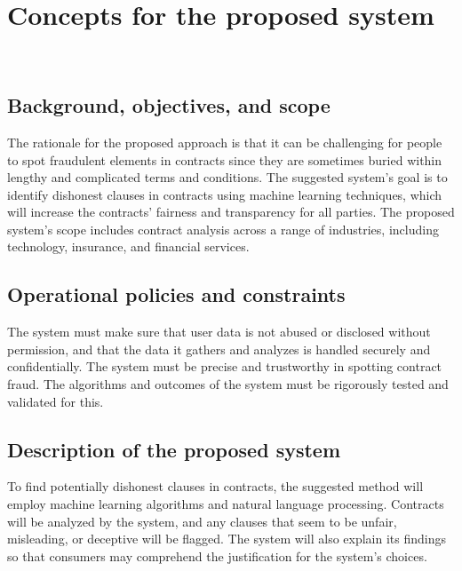 \chapter{Concepts for the proposed system \\
\label{Chapter::Concepts for the proposed system}}\



\section{Background, objectives, and scope \label{Section::Background,objectives,and scope proposed}}
The rationale for the proposed approach is that it can be challenging for people to spot fraudulent elements in contracts since they are sometimes buried within lengthy and complicated terms and conditions. The suggested system's goal is to identify dishonest clauses in contracts using machine learning techniques, which will increase the contracts' fairness and transparency for all parties. The proposed system's scope includes contract analysis across a range of industries, including technology, insurance, and financial services.


\section{Operational policies and constraints \label{Section::Operational Policies and Constraints proposed}}
The system must make sure that user data is not abused or disclosed without permission, and that the data it gathers and analyzes is handled securely and confidentially.
The system must be precise and trustworthy in spotting contract fraud. The algorithms and outcomes of the system must be rigorously tested and validated for this.


\section{Description of the proposed system \label{Section::Description of the proposed System proposed}}
To find potentially dishonest clauses in contracts, the suggested method will employ machine learning algorithms and natural language processing. Contracts will be analyzed by the system, and any clauses that seem to be unfair, misleading, or deceptive will be flagged. The system will also explain its findings so that consumers may comprehend the justification for the system's choices.



